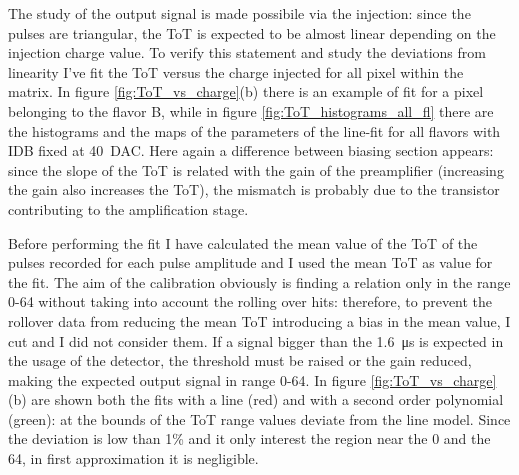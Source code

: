         The study of the output signal is made possibile via the injection: since the pulses are triangular, the ToT is expected to be almost linear depending on the injection charge value.
        To verify this statement and study the deviations from linearity I've fit the ToT versus the charge injected for all pixel within the matrix.
        In figure \ref{fig:ToT_vs_charge}(b) there is an example of fit for a pixel belonging to the flavor B, while in figure \ref{fig:ToT_histograms_all_fl} there are the histograms and the maps of the parameters of the line-fit for all flavors with IDB fixed at \SI{40}{DAC}. Here again a difference between biasing section appears: since the slope of the ToT is related with the gain of the preamplifier (increasing the gain also increases the ToT), the mismatch is probably due to the transistor contributing to the amplification stage.

        Before performing the fit I have calculated the mean value of the ToT of the pulses recorded for each pulse amplitude and I used the mean ToT as value for the fit. 
        The aim of the calibration obviously is finding a relation only in the range 0-64 without taking into account the rolling over hits: therefore, to prevent the rollover data from reducing the mean ToT introducing a bias in the mean value, I cut and I did not consider them. 
        If a signal bigger than the \SI{1.6}{\us} is expected in the usage of the detector, the threshold must be raised or the gain reduced, making the expected output signal in range 0-64. 
        In figure \ref{fig:ToT_vs_charge} (b) are shown both the fits with a line (red) and with a second order polynomial (green): at the bounds of the ToT range values deviate from the line model. Since the deviation is low than 1\% and it only interest the region near the 0 and the 64, in first approximation it is negligible. 
        
